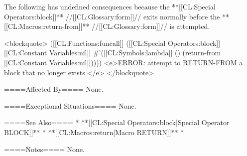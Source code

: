 The following has undefined consequences because the **[[CL:Special Operators:block]]** //[[CL:Glossary:form]]// exits normally before the **[[CL:Macros:return-from]]** //[[CL:Glossary:form]]// is attempted.

<blockquote>
([[CL:Functions:funcall]] ([[CL:Special Operators:block]] [[CL:Constant Variables:nil]] #'([[CL:Symbols:lambda]] () (return-from [[CL:Constant Variables:nil]]))))
<e>ERROR: attempt to RETURN-FROM a block that no longer exists.</e>
</blockquote>

====Affected By====
None.

====Exceptional Situations====
None.

====See Also====
  * **[[CL:Special Operators:block|Special Operator BLOCK]]**
  * **[[CL:Macros:return|Macro RETURN]]**
  * {\secref\Evaluation}

====Notes====
None.

